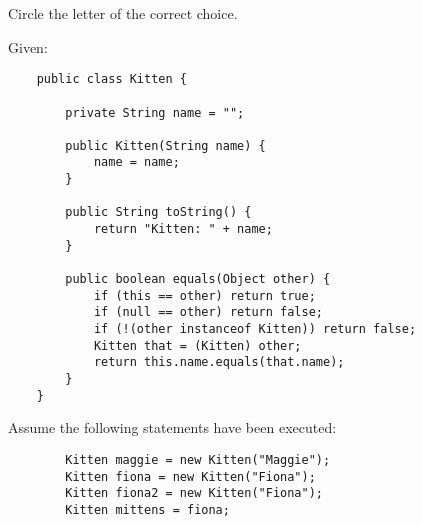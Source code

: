 \documentclass[addpoints,9pt]{exam}
\begin{document}
\begin{questions}



\newpage


 Circle the letter of the correct choice.

\begin{parts}

Given:
\begin{lstlisting}
    public class Kitten {

        private String name = "";

        public Kitten(String name) {
            name = name;
        }

        public String toString() {
            return "Kitten: " + name;
        }

        public boolean equals(Object other) {
            if (this == other) return true;
            if (null == other) return false;
            if (!(other instanceof Kitten)) return false;
            Kitten that = (Kitten) other;
            return this.name.equals(that.name);
        }
    }
\end{lstlisting}
Assume the following statements have been executed:
\begin{lstlisting}
        Kitten maggie = new Kitten("Maggie");
        Kitten fiona = new Kitten("Fiona");
        Kitten fiona2 = new Kitten("Fiona");
        Kitten mittens = fiona;
\end{lstlisting}


\end{parts}
\end{questions}
\end{document}
